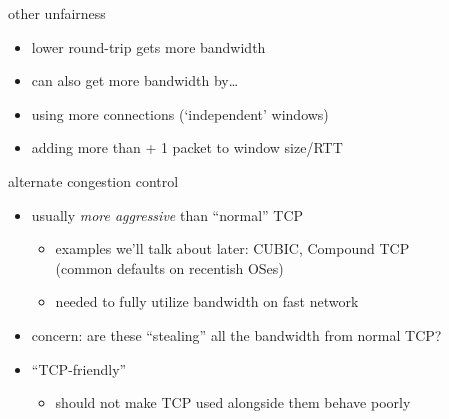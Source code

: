 \usetikzlibrary{calc}
\begin{frame}{other unfairness}
    \begin{itemize}
    \item lower round-trip gets more bandwidth
    \item can also get more bandwidth by\ldots
    \vspace{.5cm}
    \item using more connections (`independent' windows)
    \item adding more than + 1 packet to window size/RTT
    \end{itemize}
\end{frame}

\begin{frame}{alternate congestion control}
    \begin{itemize}
    \item usually \textit{more aggressive} than ``normal'' TCP
        \begin{itemize}
        \item examples we'll talk about later: CUBIC, Compound TCP \\
            (common defaults on recentish OSes)
        \item needed to fully utilize bandwidth on fast network
        \end{itemize}
    \vspace{.5cm}
    \item concern: are these ``stealing'' all the bandwidth from normal TCP?
    \item ``TCP-friendly''
        \begin{itemize}
        \item should not make TCP used alongside them behave poorly
        \end{itemize}
    \end{itemize}
\end{frame}

